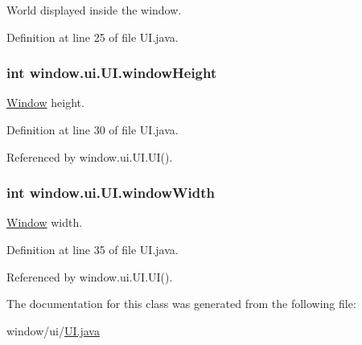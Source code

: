 World displayed inside the window. 



Definition at line 25 of file U\-I.\-java.

\hypertarget{a00034_ad1a84d64616615d037c1ebca54647610}{
\subsubsection[{window\-Height}]{\setlength{\rightskip}{0pt plus 5cm}int window.\-ui.\-U\-I.\-window\-Height\hspace{0.3cm}{\ttfamily [protected]}}}\label{a00034_ad1a84d64616615d037c1ebca54647610}


\hyperlink{a00037}{Window} height. 



Definition at line 30 of file U\-I.\-java.



Referenced by window.\-ui.\-U\-I.\-U\-I().

\hypertarget{a00034_a4c35432cda424d024255606d4f95caf2}{
\subsubsection[{window\-Width}]{\setlength{\rightskip}{0pt plus 5cm}int window.\-ui.\-U\-I.\-window\-Width\hspace{0.3cm}{\ttfamily [protected]}}}\label{a00034_a4c35432cda424d024255606d4f95caf2}


\hyperlink{a00037}{Window} width. 



Definition at line 35 of file U\-I.\-java.



Referenced by window.\-ui.\-U\-I.\-U\-I().



The documentation for this class was generated from the following file\-:\begin{DoxyCompactItemize}
\item 
window/ui/\hyperlink{a00056}{U\-I.\-java}\end{DoxyCompactItemize}
